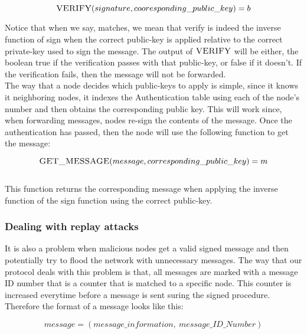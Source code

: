 \documentclass[letterpaper]{article}
\begin{document}
$$\textsc{VERIFY}(signature, cooresponding\_public\_key) =  b $$

Notice that when we say, matches, we mean that verify is indeed the inverse function of sign when the correct public-key is applied relative to the correct private-key used to sign the message.
The output of $\textsc{VERIFY}$ will be either, the boolean true if the verification passes with that public-key, or false if it doesn't. If the verification fails, then the message will not be forwarded. 
\\
The way that a node decides which public-keys to apply is simple, since it knows it neighboring nodes, it indexes the Authentication table using each of the node's number and then obtains the corresponding public key.
This will work since, when forwarding messages, nodes re-sign the contents of the message.
Once the authentication has passed, then the node will use the following function to get the message:

$$\textsc{GET\_MESSAGE}(message, corresponding\_public\_key) = m$$
\\

This function returns the corresponding message when applying the inverse function of the sign function using the correct public-key.

\subsubsection{Dealing with replay attacks}

It is also a problem when malicious nodes get a valid signed message and then potentially try to flood the network with unnecessary messages. The way that our protocol deals with this problem is that, all messages are marked with a message ID number that is a counter that is matched to a specific node. This counter is increased everytime before a message is sent suring the signed procedure. Therefore the format of a message looks like this:

$$message = (message\_information, \ message\_ID\_Number)$$
\end{document}
